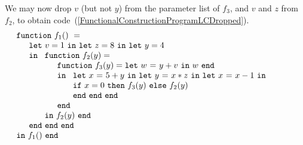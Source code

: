 We may now drop $v$ (but not $y$) from the parameter list of $f_3$,
and $v$ and $z$ from $f_2$, to obtain
code~(\ref{FunctionalConstructionProgramLCDropped}).
\begin{equation}
\label{FunctionalConstructionProgramLCDropped}
\begin{array}{l}
\mathtt{function}\ f_1()\ = \\
  \quad
  \begin{array}{l}
     \mathtt{let}\ v = 1 \ 
     \mathtt{in\ let}\ z = 8 \ 
     \mathtt{in\ let}\ y = 4\\
     \mathtt{in}\ 
     \begin{array}[t]{l}
       \mathtt{function}\ f_2(y) = \\
       \quad \begin{array}{l}  
               \mathtt{function}\ f_3(y) = \letin w {y+v} w\\
               \mathtt{in}\
               \begin{array}[t]{l}
                  \letinD x {5+y} {
                  \letinD y {x*z} {
                   \letinD x {x-1} {}}}\\ 
                  \ite {x=0} {\call {f_3} {y}}
                     {\call {f_2} {y}}\\
                  \mathtt{end}\ \mathtt{end}\ \mathtt{end}
               \end{array}\\
               \mathtt{end}
             \end{array}\\
       \mathtt{in}\ f_2(y)\ \mathtt{end}
     \end{array}\\
     \mathtt{end}\ \mathtt{end}\ \mathtt{end}
  \end{array}\\
  \mathtt{in}\ f_1()\ \mathtt{end}
\end{array}
\end{equation}
